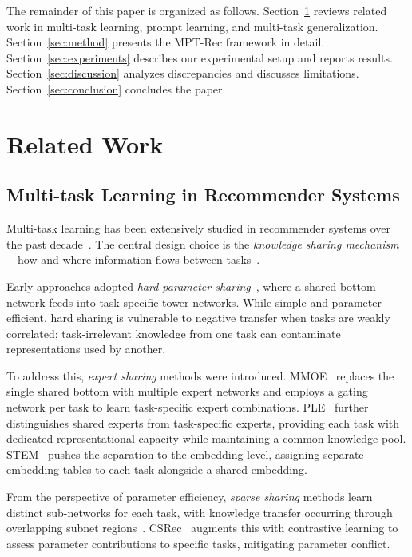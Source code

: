 \documentclass[review,anonymous]{acmart}
\begin{document}
The remainder of this paper is organized as follows. Section~\ref{sec:related}
reviews related work in multi-task learning, prompt learning, and multi-task
generalization. Section~\ref{sec:method} presents the MPT-Rec framework in detail.
Section~\ref{sec:experiments} describes our experimental setup and reports results.
Section~\ref{sec:discussion} analyzes discrepancies and discusses limitations.
Section~\ref{sec:conclusion} concludes the paper.

\section{Related Work}
\label{sec:related}

\subsection{Multi-task Learning in Recommender Systems}

Multi-task learning has been extensively studied in recommender systems over the
past decade~\cite{lu2018why,crawshaw2020multitask,wang2023multi,zhang2023advances}.
The central design choice is the \emph{knowledge sharing mechanism}---how and where
information flows between tasks~\cite{ma2018modeling,tang2020progressive}.

Early approaches adopted \emph{hard parameter sharing}~\cite{caruana1997multitask,
ruder2017overview}, where a shared bottom network feeds into task-specific tower
networks. While simple and parameter-efficient, hard sharing is vulnerable to
negative transfer when tasks are weakly correlated; task-irrelevant knowledge from
one task can contaminate representations used by another.

To address this, \emph{expert sharing} methods were introduced. MMOE~\cite{ma2018modeling}
replaces the single shared bottom with multiple expert networks and employs a
gating network per task to learn task-specific expert combinations. PLE~\cite{tang2020progressive}
further distinguishes shared experts from task-specific experts, providing each
task with dedicated representational capacity while maintaining a common knowledge
pool. STEM~\cite{su2023stem} pushes the separation to the embedding level, assigning
separate embedding tables to each task alongside a shared embedding.

From the perspective of parameter efficiency, \emph{sparse sharing} methods
learn distinct sub-networks for each task, with knowledge transfer occurring
through overlapping subnet regions~\cite{sun2020learning}. CSRec~\cite{bai2022contrastive}
augments this with contrastive learning to assess parameter contributions to
specific tasks, mitigating parameter conflict.
\end{document}
